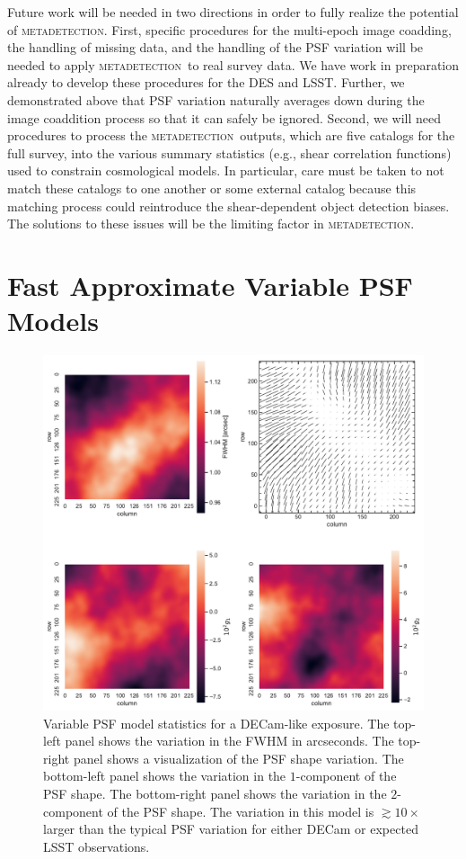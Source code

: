 \documentclass[fleqn,useAMS,usenatbib]{mnras}
\newcommand{\mdet}{\textsc{metadetection}}
\begin{document}
Future work will be needed in two directions in order to fully realize the
potential of \mdet. First, specific procedures for the multi-epoch image coadding,
the handling of missing data, and the handling of the PSF variation will be needed to
apply \mdet\ to real survey data. We have work in preparation already to develop
these procedures for the DES and LSST. Further, we demonstrated above that PSF
variation naturally averages down during the image coaddition process so that it
can safely be ignored. Second, we will need procedures to process the \mdet\ outputs,
which are five catalogs for the full survey, into the various summary statistics
(e.g., shear correlation functions) used to constrain cosmological models. In particular,
care must be taken to not match these catalogs to one another or some external catalog
because this matching process could reintroduce the shear-dependent object detection biases.
The solutions to these issues will be the limiting factor in \mdet.




\appendix

\section{Fast Approximate Variable PSF Models}\label{app:pspsf}

\begin{figure}
  \includegraphics[width=\textwidth]{figures/pspsf.pdf}
  \caption{
    Variable PSF model statistics for a DECam-like exposure. The top-left
    panel shows the variation in the FWHM in arcseconds. The top-right panel
    shows a visualization of the PSF shape variation. The bottom-left panel shows
    the variation in the $1$-component of the PSF shape. The bottom-right panel
    shows the variation in the $2$-component of the PSF shape. The variation in
    this model is $\gtrsim10\times$ larger than the typical PSF variation for
    either DECam or expected LSST observations.
    \label{fig:pspsf}}
\end{figure}
\end{document}
